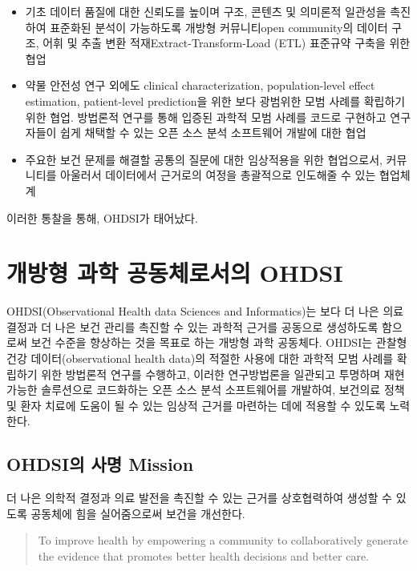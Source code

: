 \documentclass[11pt]{book}
\providecommand{\tightlist}{%
  \setlength{\itemsep}{0pt}\setlength{\parskip}{0pt}}
\theoremstyle{definition}
\theoremstyle{definition}
\theoremstyle{definition}
\theoremstyle{remark}
\begin{document}
\begin{itemize}
\tightlist
\item
  기초 데이터 품질에 대한 신뢰도를 높이며 구조, 콘텐츠 및 의미론적
  일관성을 촉진하여 표준화된 분석이 가능하도록 개방형 커뮤니티open
  community의 데이터 구조, 어휘 및 추출 변환 적재Extract-Transform-Load
  (ETL) 표준규약 구축을 위한 협업
\item
  약물 안전성 연구 외에도 clinical characterization, population-level
  effect estimation, patient-level prediction을 위한 보다 광범위한 모범
  사례를 확립하기 위한 협업. 방법론적 연구를 통해 입증된 과학적 모범
  사례를 코드로 구현하고 연구자들이 쉽게 채택할 수 있는 오픈 소스 분석
  소프트웨어 개발에 대한 협업
\item
  주요한 보건 문제를 해결할 공통의 질문에 대한 임상적용을 위한
  협업으로서, 커뮤니티를 아울러서 데이터에서 근거로의 여정을 총괄적으로
  인도해줄 수 있는 협업체계
\end{itemize}

이러한 통찰을 통해, OHDSI가 태어났다.

\section{개방형 과학 공동체로서의 OHDSI}\label{---ohdsi}

OHDSI(Observational Health data Sciences and Informatics)는 보다 더 나은
의료 결정과 더 나은 보건 관리를 촉진할 수 있는 과학적 근거를 공동으로
생성하도록 함으로써 보건 수준을 향상하는 것을 목표로 하는 개방형 과학
공동체다. \citep{Hripcsak2015} OHDSI는 관찰형 건강 데이터(observational
health data)의 적절한 사용에 대한 과학적 모범 사례를 확립하기 위한
방법론적 연구를 수행하고, 이러한 연구방법론을 일관되고 투명하며 재현
가능한 솔루션으로 코드화하는 오픈 소스 분석 소프트웨어를 개발하여,
보건의료 정책 및 환자 치료에 도움이 될 수 있는 임상적 근거를 마련하는
데에 적용할 수 있도록 노력한다.

\subsection{OHDSI의 사명 Mission}\label{ohdsi--mission}

더 나은 의학적 결정과 의료 발전을 촉진할 수 있는 근거를 상호협력하여
생성할 수 있도록 공동체에 힘을 실어줌으로써 보건을 개선한다.

\begin{quote}
To improve health by empowering a community to collaboratively generate
the evidence that promotes better health decisions and better care.
\end{quote}
\end{document}
